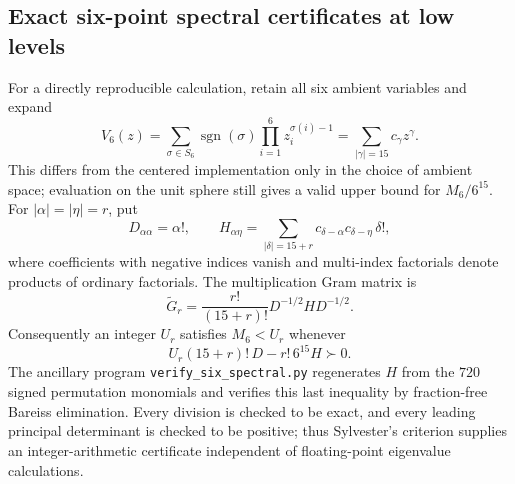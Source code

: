\documentclass[11pt]{article}
\theoremstyle{remark}
\numberwithin{equation}{section}
\begin{document}

\subsection{Exact six-point spectral certificates at low levels}
For a directly reproducible calculation, retain all six ambient
variables and expand
\[
 V_6(z)=\sum_{\sigma\in S_6}\operatorname{sgn}(\sigma)
             \prod_{i=1}^6z_i^{\sigma(i)-1}
        =\sum_{|\gamma|=15}c_\gamma z^\gamma .
\]
This differs from the centered implementation only in the choice of
ambient space; evaluation on the unit sphere still gives a valid
upper bound for $M_6/6^{15}$. For $|\alpha|=|\eta|=r$, put
\[
 D_{\alpha\alpha}=\alpha!,\qquad
 H_{\alpha\eta}=\sum_{|\delta|=15+r}
            c_{\delta-\alpha}c_{\delta-\eta}\,\delta!,
\]
where coefficients with negative indices vanish and multi-index
factorials denote products of ordinary factorials. The multiplication
Gram matrix is
\[
 \widetilde G_r=\frac{r!}{(15+r)!}D^{-1/2}HD^{-1/2}.
\]
Consequently an integer $U_r$ satisfies $M_6<U_r$ whenever
\[
 U_r(15+r)!\,D-r!\,6^{15}H\succ0.
\]
The ancillary program \texttt{verify\_six\_spectral.py} regenerates
$H$ from the $720$ signed permutation monomials and verifies this
last inequality by fraction-free Bareiss elimination. Every division
is checked to be exact, and every leading principal determinant is
checked to be positive; thus Sylvester's criterion supplies an
integer-arithmetic certificate independent of floating-point
eigenvalue calculations.
\end{document}
